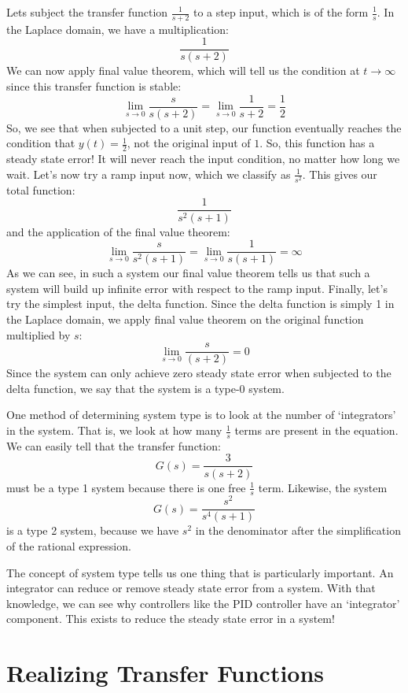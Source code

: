 \begin{example}
Lets subject the transfer function $\frac{1}{s+2}$ to a step input, which is of the form $\frac{1}{s}$. In the Laplace domain, we have a multiplication:
$$\frac{1}{s(s+2)}$$
We can now apply final value theorem, which will tell us the condition at $t\rightarrow\infty$ since this transfer function is stable:
$$\lim_{s\rightarrow0}\frac{s}{s(s+2)}=\lim_{s\rightarrow0}\frac{1}{s+2}=\frac{1}{2}$$So, we see that when subjected to a unit step, our function eventually reaches the condition that $y(t)=\frac{1}{2}$, not the original input of $1$. So, this function has a steady state error! It will never reach the input condition, no matter how long we wait. Let's now try a ramp input now, which we classify as $\frac{1}{s^2}$. This gives our total function:
$$\frac{1}{s^2(s+1)}$$
and the application of the final value theorem:
$$\lim_{s\rightarrow0}\frac{s}{s^2(s+1)}=\lim_{s\rightarrow0}\frac{1}{s(s+1)}=\infty$$
As we can see, in such a system our final value theorem tells us that such a system will build up infinite error with respect to the ramp input. Finally, let's try the simplest input, the delta function. Since the delta function is simply 1 in the Laplace domain, we apply final value theorem on the original function multiplied by $s$:
$$\lim_{s\rightarrow0}\frac{s}{(s+2)}=0$$
Since the system can only achieve zero steady state error when subjected to the delta function, we say that the system is a type-0 system.
\end{example}

One method of determining system type is to look at the number of `integrators' in the system. That is, we look at how many $\frac{1}{s}$ terms are present in the equation. We can easily tell that the transfer function:
$$G(s)=\frac{3}{s(s+2)}$$
must be a type 1 system because there is one free $\frac{1}{s}$ term. Likewise, the system
$$G(s)=\frac{s^2}{s^4(s+1)}$$
is a type 2 system, because we have $s^2$ in the denominator after the simplification of the rational expression.

The concept of system type tells us one thing that is particularly important. An integrator can reduce or remove steady state error from a system. With that knowledge, we can see why controllers like the PID controller have an `integrator' component. This exists to reduce the steady state error in a system!


\section{Realizing Transfer Functions}


